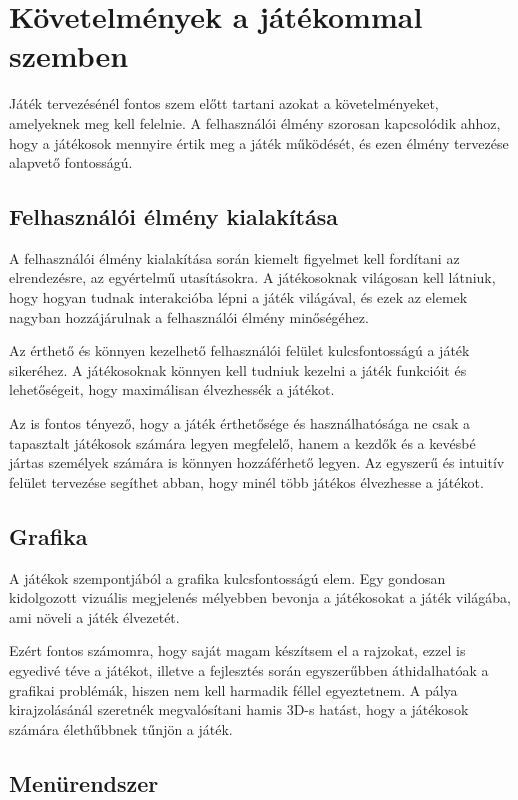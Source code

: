 \chapter{Követelmények a játékommal szemben}
 Játék tervezésénél fontos szem előtt tartani azokat a követelményeket, amelyeknek meg kell felelnie. A felhasználói élmény szorosan kapcsolódik ahhoz, hogy a játékosok mennyire értik meg a játék működését, és ezen élmény tervezése alapvető fontosságú.


\section{Felhasználói élmény kialakítása}

 A felhasználói élmény kialakítása során kiemelt figyelmet kell fordítani az elrendezésre, az egyértelmű utasításokra. A játékosoknak világosan kell látniuk, hogy hogyan tudnak interakcióba lépni a játék világával, és ezek az elemek nagyban hozzájárulnak a felhasználói élmény minőségéhez.

Az érthető és könnyen kezelhető felhasználói felület kulcsfontosságú a játék sikeréhez. A játékosoknak könnyen kell tudniuk kezelni a játék funkcióit és lehetőségeit, hogy maximálisan élvezhessék a játékot.

Az is fontos tényező, hogy a játék érthetősége és használhatósága ne csak a tapasztalt játékosok számára legyen megfelelő, hanem a kezdők és a kevésbé jártas személyek számára is könnyen hozzáférhető legyen. Az egyszerű és intuitív felület tervezése segíthet abban, hogy minél több játékos élvezhesse a játékot.


\section{Grafika}

 A játékok szempontjából a grafika kulcsfontosságú elem. Egy gondosan kidolgozott vizuális megjelenés mélyebben bevonja a játékosokat a játék világába, ami növeli a játék élvezetét.

Ezért fontos számomra, hogy saját magam készítsem el a rajzokat, ezzel is egyedivé téve a játékot, illetve a fejlesztés során egyszerűbben áthidalhatóak a grafikai problémák, hiszen nem kell harmadik féllel egyeztetnem. A pálya kirajzolásánál szeretnék megvalósítani hamis 3D-s hatást, hogy a játékosok számára élethűbbnek tűnjön a játék. 


\section{Menürendszer}

